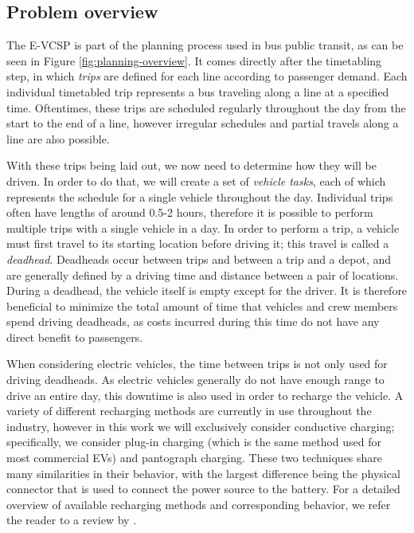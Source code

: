 \documentclass[]{article}
\begin{document}
\subsection{Problem overview}
The E-VCSP is part of the planning process used in bus public transit, as can be seen in Figure \ref{fig:planning-overview}. It comes directly after the timetabling step, in which \emph{trips} are defined for each line according to passenger demand. Each individual timetabled trip represents a bus traveling along a line at a specified time. Oftentimes, these trips are scheduled regularly throughout the day from the start to the end of a line, however irregular schedules and partial travels along a line are also possible.

With these trips being laid out, we now need to determine how they will be driven. In order to do that, we will create a set of \emph{vehicle tasks}, each of which represents the schedule for a single vehicle throughout the day. Individual trips often have lengths of around 0.5-2 hours, therefore it is possible to perform multiple trips with a single vehicle in a day. In order to perform a trip, a vehicle must first travel to its starting location before driving it; this travel is called a \emph{deadhead}. Deadheads occur between trips and between a trip and a depot, and are generally defined by a driving time and distance between a pair of locations. During a deadhead, the vehicle itself is empty except for the driver. It is therefore beneficial to minimize the total amount of time that vehicles and crew members spend driving deadheads, as costs incurred during this time do not have any direct benefit to passengers.

When considering electric vehicles, the time between trips is not only used for driving deadheads. As electric vehicles generally do not have enough range to drive an entire day, this downtime is also used in order to recharge the vehicle. A variety of different recharging methods are currently in use throughout the industry, however in this work we will exclusively consider conductive charging; specifically, we consider plug-in charging (which is the same method used for most commercial EVs) and pantograph charging. These two techniques share many similarities in their behavior, with the largest difference being the physical connector that is used to connect the power source to the battery. For a detailed overview of available recharging methods and corresponding behavior, we refer the reader to a review by \citet{Zhou2024}.
\end{document}
